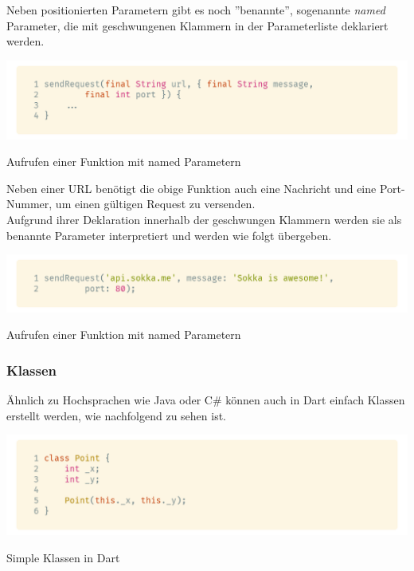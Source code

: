 \newpage

Neben positionierten Parametern gibt es noch ''benannte'', sogenannte \textit{named} Parameter, 
die mit geschwungenen Klammern in der Parameterliste deklariert werden.\\

\begin{code}
    \centering
    \includegraphics[width=1\textwidth]{images/Dart/theory/dartNamedArguments.png}
    \caption{Aufrufen einer Funktion mit named Parametern}
\end{code}

Neben einer URL benötigt die obige Funktion auch eine Nachricht und eine Port-Nummer,
um einen gültigen Request zu versenden.\\
Aufgrund ihrer Deklaration innerhalb der geschwungen Klammern
werden sie als benannte Parameter interpretiert und werden wie folgt übergeben.

\begin{code}
    \centering
    \includegraphics[width=1\textwidth]{images/Dart/theory/dartCallNamedArguments.png}
    \caption{Aufrufen einer Funktion mit named Parametern}
\end{code}

\newpage

\subsubsection{Klassen}

Ähnlich zu Hochsprachen wie Java oder C\# können auch in Dart einfach Klassen
erstellt werden, wie nachfolgend zu sehen ist.

\begin{code}
    \centering
    \includegraphics[width=1\textwidth]{images/Dart/theory/dartClass.png}
    \caption{Simple Klassen in Dart}
\end{code}

